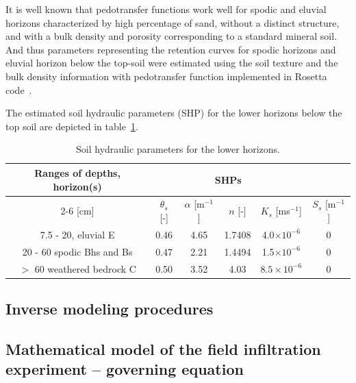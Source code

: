 \documentclass[review]{myarticle}
\begin{document}
It is well known that pedotransfer functions work well for spodic and eluvial horizons characterized by high percentage of sand, without a distinct structure, and with a bulk density and porosity corresponding to a standard mineral soil. And thus parameters representing the retention curves for spodic horizons and eluvial horizon below the top-soil were estimated using the soil texture and the bulk density information with pedotransfer function implemented in Rosetta code~\citep{Schaap}.

The estimated soil hydraulic parameters (SHP) for the lower horizons below the top soil are depicted in table~\ref{tab_SHP}.

\begin{table}[ht]
\begin{center}
\caption{Soil hydraulic parameters for the lower horizons.}
\begin{small}
\doublespacing
\begin{tabular}{c c c c c c}
\toprule
Ranges of depths, horizon(s)&\multicolumn{4}{c}{SHPs}\\ \cline{2-6}
[cm]&$\theta_s$ [-] & $\alpha$ [m$^{-1}$]& $n$ [-]& $K_s$ [ms$^{-1}$] & $S_s$ [m$^{-1}$] \\ \hline
7.5 - 20, eluvial E&0.46&4.65&1.7408&4.0$\times 10^{-6}$ & 0\\
20 - 60 spodic Bhs and Bs&0.47&2.21&1.4494&1.5$\times 10^{-6}$ & 0\\
$>$ 60 weathered bedrock C & 0.50 & 3.52 & 4.03 &  $8.5\times 10^{-6}$ & 0 \\
\toprule
\end{tabular}
\end{small}
\label{tab_SHP}
\end{center}
\end{table}


\subsection{Inverse modeling procedures}
\label{invproc}

\subsection{Mathematical model of the field infiltration experiment -- governing equation}%
\label{goveq}
\end{document}
